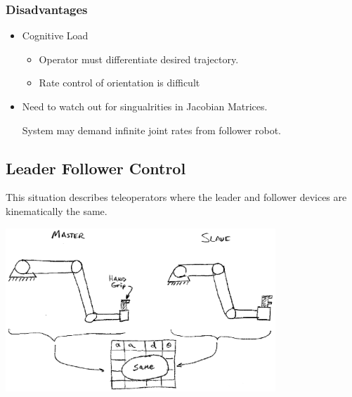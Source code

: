 

\subsubsection*{Disadvantages}
\begin{itemize}
   \item Cognitive Load
           \begin{itemize}
                 \item Operator must differentiate desired trajectory.
		 \item Rate control of orientation is difficult
            \end{itemize}
   \item Need to watch out for singualrities in Jacobian Matrices.

System may demand infinite joint rates from follower robot.
\end{itemize}






\subsection{Leader Follower Control}

This situation describes teleoperators where the leader and follower devices are kinematically the same.

\includegraphics[width=4.0in]{figs14/00401.eps}

